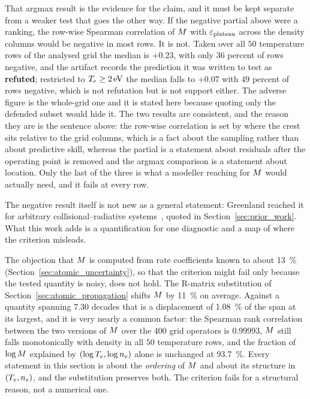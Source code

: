That argmax result is the evidence for the claim, and it must be kept separate
from a weaker test that goes the other way. If the negative partial above were
a ranking, the row-wise Spearman correlation of $M$ with $\varepsilon_{\mathrm{plateau}}$ across
the density columns would be negative in most rows. It is not. Taken over all
$50$ temperature rows of the analysed grid the median is $+0.23$, with only
$36$ percent of rows negative, and the artifact records the prediction it was written to test as
\textbf{refuted}; restricted to $T_e\ge\SI{2}{\electronvolt}$ the median falls
to $+0.07$ with $49$ percent of rows negative, which is not refutation but is
not support either. The adverse figure is the whole-grid one and it is stated
here because quoting only the defended subset would hide it. The two results
are consistent, and the reason they are is the sentence above: the row-wise
correlation is set by where the crest sits relative to the grid columns, which
is a fact about the sampling rather than about predictive skill, whereas the
partial is a statement about residuals after the operating point is removed and
the argmax comparison is a statement about location. Only the last of the three
is what a modeller reaching for $M$ would actually need, and it fails at
every row.

The negative result itself is not new as a general statement: Greenland reached
it for arbitrary collisional--radiative
systems~\cite{Greenland2001b,Greenland2001a}, quoted in
Section~\ref{sec:prior_work}. What this work adds is a quantification for one
diagnostic and a map of where the criterion misleads.

The objection that $M$ is computed from rate coefficients known to about
\SI{13}{\percent} (Section~\ref{sec:atomic_uncertainty}), so that the criterion
might fail only because the tested quantity is noisy, does not hold. The
R-matrix substitution of Section~\ref{sec:atomic_propagation} shifts $M$ by
\SI{11}{\percent} on average. Against a quantity spanning
\num{7.30} decades that is a displacement of \SI{1.08}{\percent} of the span at
its largest, and it is very nearly a common factor: the Spearman rank
correlation between the two versions of $M$ over the 400 grid operators is
$0.99993$, $M$ still falls monotonically with density in all $50$
temperature rows, and the fraction of $\log M$ explained by
$(\log T_e, \log n_e)$ alone is unchanged at \SI{93.7}{\percent}. Every
statement in this section is about the \emph{ordering} of $M$ and about its
structure in $(T_e,n_e)$, and the substitution preserves both. The criterion
fails for a structural reason, not a numerical one.

